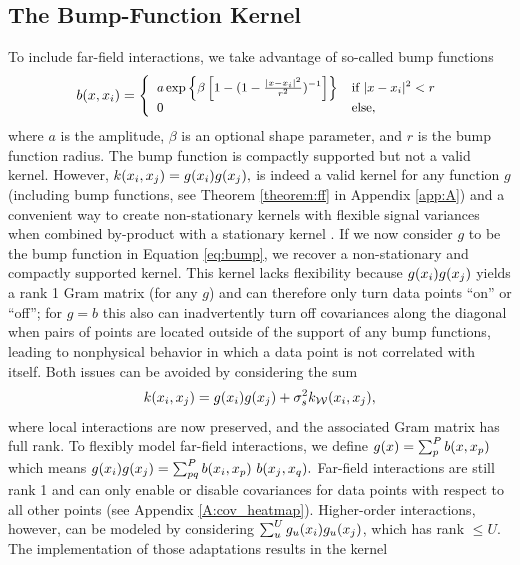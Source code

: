 \documentclass{article}
\renewcommand{\mathbf}[1]{%
  \ifx#1x x\else \textbf{#1}\fi
}
\begin{document}
\subsection{The Bump-Function Kernel}
To include far-field interactions, we take advantage of so-called bump functions
\begin{equation} \label{eq:bump}
\small
b(\mathbf{x}, \mathbf{x}_i) = \left\{ \begin{array}{ll}
   a \exp\left\{ \beta \left[ 1 - (1-\frac{|\mathbf{x}-\mathbf{x}_i|^2}{r^2})^{-1} \right] \right\}  & \text{if } |\mathbf{x}-\mathbf{x}_i|^2 < r  \\
   0  & \text{else},
\end{array} \right. 
\end{equation}
where $a$ is the amplitude, $\beta$ is an optional shape parameter, and $r$ is the bump function radius. 
The bump function is compactly supported but not a valid kernel. However,
$
    k(\mathbf{x}_i,\mathbf{x}_j) = g(\mathbf{x}_i) g(\mathbf{x}_j), %
$
is indeed a valid kernel for any function $g$ (including bump functions, see Theorem \ref{theorem:ff} in Appendix \ref{app:A}) and a convenient way to create non-stationary kernels with flexible signal variances when combined by-product with a stationary kernel \citep{noack2022advanced}. If we now consider $g$ to be the bump function in Equation \eqref{eq:bump}, we recover a non-stationary and compactly supported kernel. This kernel lacks flexibility because $g(\mathbf{x}_i) g(\mathbf{x}_j)$ yields a rank 1 Gram matrix (for any $g$) and can therefore only turn data points ``on'' or ``off''; for $g=b$ this also can inadvertently turn off covariances along the diagonal when pairs of points are located outside of the support of any bump functions, leading to nonphysical behavior in which a data point is not correlated with itself. Both issues can be avoided by considering the sum
\begin{align}
    k(\mathbf{x}_i,\mathbf{x}_j) = g(\mathbf{x}_i) g(\mathbf{x}_j) + \sigma_s^2 k_{\mathcal{W}}(\mathbf{x}_i,\mathbf{x}_j),
\end{align}
where local interactions are now preserved, and the associated Gram matrix has full rank. To flexibly model far-field interactions, we define
$
    g(\mathbf{x})=\sum_p^P b(\mathbf{x}, \mathbf{x}_p)
$
which means 
$
g(\mathbf{x}_i) g(\mathbf{x}_j) = \sum_{pq}^P b(\mathbf{x}_i, \mathbf{x}_p) ~b(\mathbf{x}_j, \mathbf{x}_q).
$
Far-field interactions are still rank 1 and can only enable or disable covariances for data points with respect to all other points (see Appendix \ref{A:cov_heatmap}). Higher-order interactions, however, can be modeled by considering $\sum_u^U g_u(\mathbf{x}_i) g_u(\mathbf{x}_j)$, which has rank $\leq U$. The implementation of those adaptations results in the kernel
\end{document}
